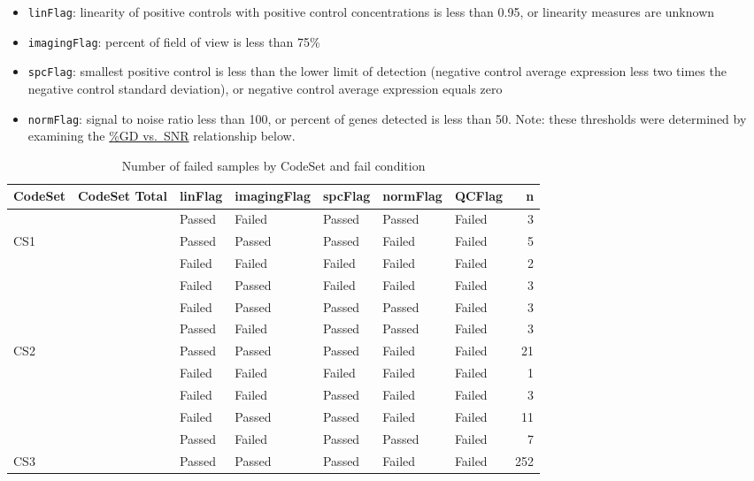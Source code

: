 \documentclass[
]{report}
\providecommand{\tightlist}{%
  \setlength{\itemsep}{0pt}\setlength{\parskip}{0pt}}
\begin{document}
\begin{itemize}
\tightlist
\item
  \texttt{linFlag}: linearity of positive controls with positive control concentrations is less than 0.95, or linearity measures are unknown
\item
  \texttt{imagingFlag}: percent of field of view is less than 75\%
\item
  \texttt{spcFlag}: smallest positive control is less than the lower limit of detection (negative control average expression less two times the negative control standard deviation), or negative control average expression equals zero
\item
  \texttt{normFlag}: signal to noise ratio less than 100, or percent of genes detected is less than 50. Note: these thresholds were determined by examining the \protect\hyperlink{gd-vs.-snr}{\%GD vs.~SNR} relationship below.
\end{itemize}

\begin{table}

\caption{\label{tab:qc-failed}Number of failed samples by CodeSet and fail condition}
\centering
\begin{tabular}[t]{l|r|l|l|l|l|l|r}
\hline
CodeSet & CodeSet Total & linFlag & imagingFlag & spcFlag & normFlag & QCFlag & n\\
\hline
 &  & Passed & Failed & Passed & Passed & Failed & 3\\
\cline{3-8}
\multirow{-2}{*}{\raggedright\arraybackslash CS1} & \multirow{-2}{*}{\raggedleft\arraybackslash 8} & Passed & Passed & Passed & Failed & Failed & 5\\
\cline{1-8}
 &  & Failed & Failed & Failed & Failed & Failed & 2\\
\cline{3-8}
 &  & Failed & Passed & Failed & Failed & Failed & 3\\
\cline{3-8}
 &  & Failed & Passed & Passed & Passed & Failed & 3\\
\cline{3-8}
 &  & Passed & Failed & Passed & Passed & Failed & 3\\
\cline{3-8}
\multirow{-5}{*}{\raggedright\arraybackslash CS2} & \multirow{-5}{*}{\raggedleft\arraybackslash 32} & Passed & Passed & Passed & Failed & Failed & 21\\
\cline{1-8}
 &  & Failed & Failed & Failed & Failed & Failed & 1\\
\cline{3-8}
 &  & Failed & Failed & Passed & Failed & Failed & 3\\
\cline{3-8}
 &  & Failed & Passed & Passed & Failed & Failed & 11\\
\cline{3-8}
 &  & Passed & Failed & Passed & Passed & Failed & 7\\
\cline{3-8}
\multirow{-5}{*}{\raggedright\arraybackslash CS3} & \multirow{-5}{*}{\raggedleft\arraybackslash 274} & Passed & Passed & Passed & Failed & Failed & 252\\
\hline
\end{tabular}
\end{table}
\end{document}
